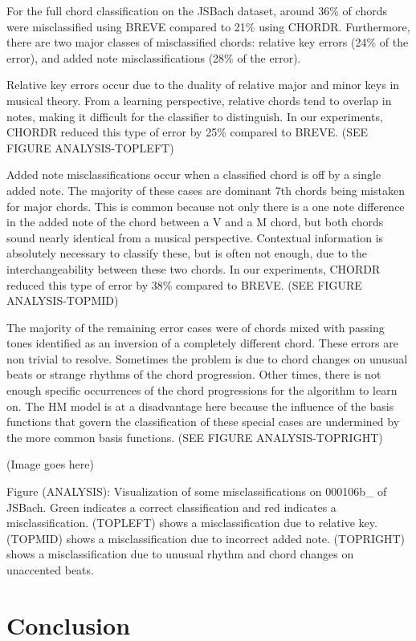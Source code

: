 \documentclass{article} %
\begin{document}
For the full chord classification on the JSBach dataset, around 36\% of chords were misclassified using BREVE compared to 21\% using CHORDR. Furthermore, there are two major classes of misclassified chords: relative key errors (24\% of the error), and added note misclassifications (28\% of the error).

Relative key errors occur due to the duality of relative major and minor keys in musical theory. From a learning perspective, relative chords tend to overlap in notes, making it difficult for the classifier to distinguish. In our experiments, CHORDR reduced this type of error by 25\% compared to BREVE. (SEE FIGURE ANALYSIS-TOPLEFT)

Added note misclassifications occur when a classified chord is off by a single added note. The majority of these cases are dominant 7th chords being mistaken for major chords. This is common because not only there is a one note difference in the added note of the chord between a V and a M chord, but both chords sound nearly identical from a musical perspective. Contextual information is absolutely necessary to classify these, but is often not enough, due to the interchangeability between these two chords. In our experiments, CHORDR reduced this type of error by 38\% compared to BREVE. (SEE FIGURE ANALYSIS-TOPMID)

The majority of the remaining error cases were of chords mixed with passing tones identified as an inversion of a completely different chord. These errors are non trivial to resolve. Sometimes the problem is due to chord changes on unusual beats or strange rhythms of the chord progression. Other times, there is not enough specific occurrences of the chord progressions for the algorithm to learn on. The HM model is at a disadvantage here because the influence of the basis functions that govern the classification of these special cases are undermined by the more common basis functions. (SEE FIGURE ANALYSIS-TOPRIGHT)

(Image goes here)

Figure (ANALYSIS): Visualization of some misclassifications on 000106b\_ of JSBach. Green indicates a correct classification and red indicates a misclassification. (TOPLEFT) shows a misclassification due to relative key. (TOPMID) shows a misclassification due to incorrect added note. (TOPRIGHT) shows a misclassification due to unusual rhythm and chord changes on unaccented beats.

\section{Conclusion}
\end{document}
